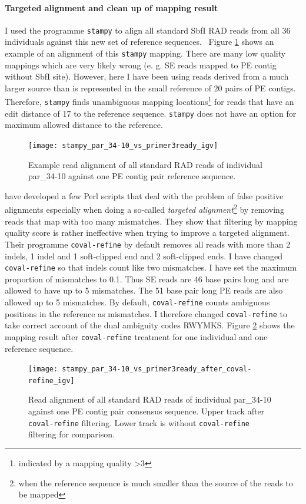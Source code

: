 \documentclass[a4paper,12pt,times,print,index,custombib,custommargin]{PhDThesisPSnPDF}\usepackage[]{graphicx}\usepackage[]{color}
\begin{document}
\paragraph{Targeted alignment and clean up of mapping result}
I used the programme \texttt{stampy} to align all standard SbfI RAD reads from all 36 individuals against this new set of reference sequences.~
Figure \ref{stampy_par_34-10_vs_primer3ready_igv} shows an example of an alignment of this \texttt{stampy} mapping. There are many low quality mappings which are very likely wrong (e. g. SE reads mapped to PE contig without SbfI site). However, here I have been using reads derived from a much larger source than is represented in the small reference of 20 pairs of PE contigs. Therefore, \texttt{stampy} finds unambiguous mapping locations\footnote{indicated by a mapping quality >3} for reads that have an \gls{edit distance} of 17 to the reference sequence. \texttt{stampy} does not have an option for maximum allowed distance to the reference.
%
\begin{figure}
\centering
\texttt{[image: stampy\_par\_34-10\_vs\_primer3ready\_igv]}
\caption{Example read alignment of all standard RAD reads of individual par\_34-10 against one PE contig pair reference sequence.}
\label{stampy_par_34-10_vs_primer3ready_igv}
\end{figure}
%
\cite{Kosugi2013} have developed a few Perl scripts that deal with the problem of false positive alignments especially when doing a so-called \emph{targeted alignment}\footnote{when the reference sequence is much smaller than the source of the reads to be mapped} by removing reads that map with too many mismatches. They show that filtering by mapping quality score is rather ineffective when trying to improve a targeted alignment. Their programme \texttt{coval-refine} by default removes all reads with more than 2 \glspl{indel}, 1 indel and 1 soft-clipped end and 2 soft-clipped ends. I have changed \texttt{coval-refine} so that indels count like two mismatches. I have set the maximum proportion of mismatches to 0.1. Thus SE reads are 46 base pairs long and are allowed to have up to 5 mismatches. The 51 base pair long PE reads are also allowed up to 5 mismatches. By default, \texttt{coval-refine} counts ambiguous positions in the reference as mismatches. I therefore changed \texttt{coval-refine} to take correct account of the dual ambiguity codes RWYMKS. Figure \ref{coval-refine} shows the mapping result after \texttt{coval-refine} treatment for one individual and one reference sequence.
%
\begin{figure}
\centering
\texttt{[image: stampy\_par\_34-10\_vs\_primer3ready\_after\_coval-refine\_igv]}
\caption{Read alignment of all standard RAD reads of individual par\_34-10 against one PE contig pair consensus sequence. Upper track after \texttt{coval-refine} filtering. Lower track is without \texttt{coval-refine} filtering for comparison.}
\label{coval-refine}
\end{figure}
%
\end{document}
